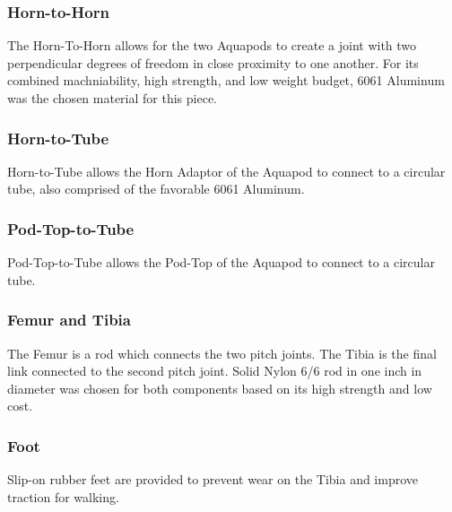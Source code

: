 \subsubsection{Horn-to-Horn}
The Horn-To-Horn allows for the two Aquapods to create a joint with two perpendicular degrees of freedom in close proximity to one another. For its combined machniability, high strength, and low weight budget, 6061 Aluminum was the chosen material for this piece.

\subsubsection{Horn-to-Tube}
Horn-to-Tube allows the Horn Adaptor of the Aquapod to connect to a circular tube, also comprised of the favorable 6061 Aluminum.

\subsubsection{Pod-Top-to-Tube}
Pod-Top-to-Tube allows the Pod-Top of the Aquapod to connect to a circular tube.  

\subsubsection{Femur and Tibia}
The Femur is a rod which connects the two pitch joints. The Tibia is the final link connected to the second pitch joint. Solid Nylon 6/6 rod in one inch in diameter was chosen for both components based on its high strength and low cost.

\subsubsection{Foot}
Slip-on rubber feet are provided to prevent wear on the Tibia and improve traction for walking. 

